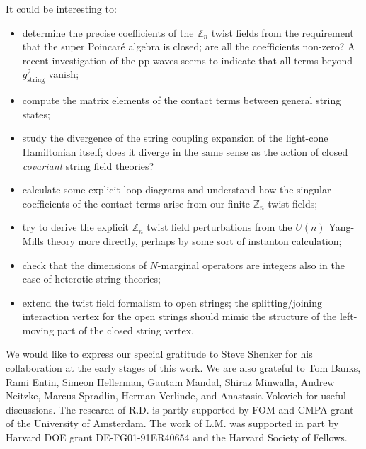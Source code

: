 \documentclass[nohyper,12pt,letterpaper]{JHEP3}
\def\IZ{{\mathbb Z}}           %
\def \gs{g_{\mathrm{string}}}
\begin{document}
It could be interesting to:
\begin{itemize}
\item determine the precise coefficients of the $\IZ_{n}$ twist fields 
from the requirement that the super Poincar\'{e} algebra is closed; are 
all the coefficients non-zero? A recent investigation of the pp-waves
\cite{nastaherman} seems to indicate that all terms beyond $\gs^2$ vanish;
\item compute the matrix elements of the contact terms between general
string states;
\item study the divergence of the string coupling expansion of the 
light-cone Hamiltonian itself; does it diverge in the same sense as the 
action of closed {\it covariant} string field theories?
\item calculate some explicit loop diagrams and understand how the 
singular coefficients of the contact terms arise from our finite $\IZ_{n}$ 
twist fields;
\item try to derive the explicit $\IZ_n$ twist field perturbations from 
the $U(n)$ Yang-Mills theory more directly, perhaps by some sort of 
instanton calculation;
\item check that the dimensions of $N$-marginal operators are integers 
also in the case of heterotic string theories;
\item extend the twist field formalism to open strings; the 
splitting/joining interaction vertex for the open strings should mimic the 
structure of the left-moving part of the closed string vertex.
\end{itemize}



\acknowledgments

We would like to express our special gratitude to
Steve Shenker for his collaboration at the early
stages of this work.
We are also grateful to 
Tom Banks,
Rami Entin,
Simeon Hellerman,
Gautam Mandal,
Shiraz Minwalla,
Andrew Neitzke, 
Marcus Spradlin,
Herman Verlinde,
and
Anastasia Volovich
for useful discussions.
The research of R.D. 
is partly supported by FOM and CMPA grant of the University of Amsterdam.
The work of L.M. was supported in part by Harvard DOE grant
DE-FG01-91ER40654 and the Harvard Society of Fellows.
\end{document}
